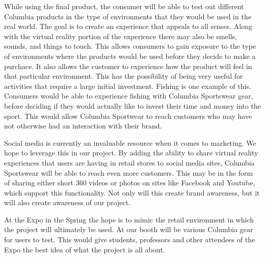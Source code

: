 \documentclass[letterpaper,10pt,titlepage]{article}
\begin{document}
While using the final product, the consumer will be able to test out different
Columbia products in the type of environments that they would be used in
the real world. The goal is to create an experience that appeals to all senses.
Along with the virtual reality portion of the experience there may also be
smells, sounds, and things to touch. This allows consumers to gain exposure to
the type of environments where the products would be used before they decide to
make a purchace. It also allows the customer to experience how the product will
feel in that particular environment. This has the possibility of being very
useful for activities that require a large initial investment. Fishing is one
example of this. Consumers would be able to experience fishing with Columbia
Sportswear gear, before deciding if they would actually like to invest their
time and money into the sport. This would allow Columbia Sportwear to reach
customers who may have not otherwise had an interaction with their brand.

Social media is currently an invaluable resource when it comes to marketing.
We hope to leverage this in our project. By adding the ability to share
virtual reality experiences that users are having in retail stores to social
media sites, Columbia Sportswear will be able to reach even more customers.
This may be in the form of sharing either short 360 videos or photos on sites
like Facebook and Youtube, which support this functionality. Not only will this
create brand awareness, but it will also create awareness of our project.

At the Expo in the Spring the hope is to mimic the retail environment in which
the project will ultimately be used. At our booth will be various Columbia gear
for users to test. This would give students, professors and other attendees of
the Expo the best idea of what the project is all about.
\end{document}
